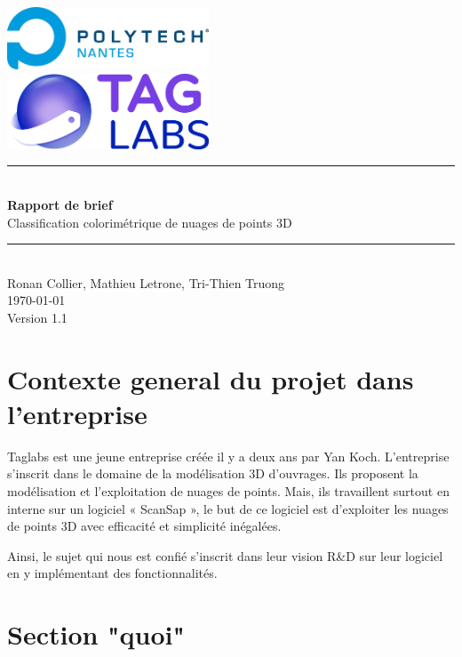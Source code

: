 \documentclass[12pt,titlepage,french]{article}
\begin{document}

\begin{titlepage}
\newcommand{\HRule}{\rule{\linewidth}{0.5mm}}
\center

  \includegraphics[width=0.45\textwidth]{../ressources/img_logos/logo_polytech.png}\\[1cm]
   
  \includegraphics[width=0.45\textwidth]{../ressources/img_logos/logo_taglabs.png}


\HRule \\[0.4cm]
{ \huge \bfseries Rapport de brief \\[0.15cm] }
Classification colorimétrique de nuages de points 3D
\HRule \\[1.5cm]
Ronan Collier,
Mathieu Letrone,
Tri-Thien Truong
\\[1cm]
\today \\ [1cm]
Version 1.1
\end{titlepage}

\section{Contexte general du projet dans l'entreprise}

Taglabs est une jeune entreprise créée il y a deux ans par Yan Koch. L'entreprise s'inscrit dans le domaine de la modélisation 3D d'ouvrages. Ils proposent la modélisation et l'exploitation de nuages de points. Mais, ils travaillent surtout en interne sur un logiciel « ScanSap », le but de ce logiciel est d'exploiter les nuages de points 3D avec efficacité et simplicité inégalées.

Ainsi, le sujet qui nous est confié s'inscrit dans leur vision R\&D sur leur logiciel en y implémentant des fonctionnalités.


\section{Section "quoi"}
\end{document}
